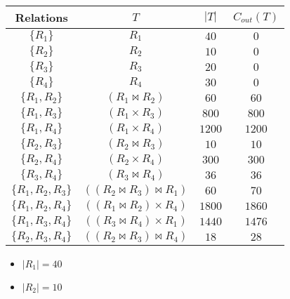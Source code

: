 \begin{enumerate}
        \begin{minipage}{0.6\textwidth}
          \begin{tabular}{|c|c|c|c|} \hline
            {\bf Relations}   & $T$                            & $|T|$  & $C_{out}(T)$ \\ \hline \hline
            $\{R_1\}$         & $R_1$                          & $40$   & $0$          \\ \hline 
            $\{R_2\}$         & $R_2$                          & $10$   & $0$          \\ \hline 
            $\{R_3\}$         & $R_3$                          & $20$   & $0$          \\ \hline 
            $\{R_4\}$         & $R_4$                          & $30$   & $0$          \\ \hline 
            $\{R_1,R_2\}$     & $(R_1 \Join R_2)$              & $60$   & $60$         \\ \hline 
            $\{R_1,R_3\}$     & $(R_1 \times R_3)$             & $800$  & $800$        \\ \hline 
            $\{R_1,R_4\}$     & $(R_1 \times R_4)$             & $1200$ & $1200$       \\ \hline 
            $\{R_2,R_3\}$     & $(R_2 \Join R_3)$              & $10$   & $10$         \\ \hline 
            $\{R_2,R_4\}$     & $(R_2 \times R_4)$             & $300$  & $300$        \\ \hline 
            $\{R_3,R_4\}$     & $(R_3 \Join R_4)$              & $36$   & $36$         \\ \hline 
            $\{R_1,R_2,R_3\}$ & $((R_2 \Join R_3) \Join R_1)$  & $60$   & $70$         \\ \hline 
            $\{R_1,R_2,R_4\}$ & $((R_1 \Join R_2) \times R_4)$ & $1800$ & $1860$       \\ \hline 
            $\{R_1,R_3,R_4\}$ & $((R_3 \Join R_4) \times R_1)$ & $1440$ & $1476$       \\ \hline 
            $\{R_2,R_3,R_4\}$ & $((R_2 \Join R_3) \Join R_4)$  & $18$   & $28$         \\ \hline 
          \end{tabular}
        \end{minipage}
        \begin{minipage}{0.49\textwidth}
          \begin{itemize}
            \item $|R_1| = 40$
            \item $|R_2| = 10$

\end{itemize}
\end{minipage}
\end{enumerate}
